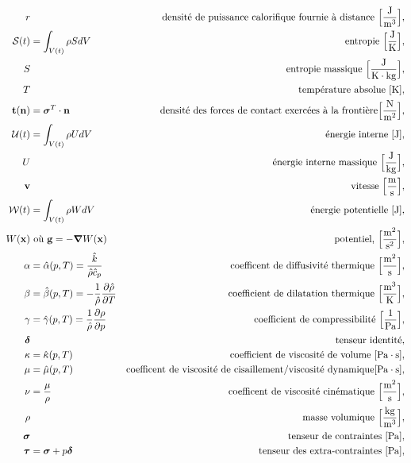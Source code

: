 \begin{align*}
      r & & \textrm{densité de puissance calorifique fournie à distance } \Big[\si{\frac{J}{m^3}}\Big],\\
      \mathcal{S}(t) &= \int_{V(t)} \rho S dV & \textrm{entropie } \Big[\si{\frac{J}{K}}\Big],\\
      S & & \textrm{entropie massique } \Big[\si{\frac{J}{K \cdot kg}}\Big],\\
      T & & \textrm{température absolue } [\si{K}],\\
      \vb{t}(\vb{n}) &= \bs{\sigma}^T \cdot \vb{n} & \textrm{densité des forces de contact exercées à la frontière} \Big[\si{\frac{N}{m^2}}\Big],\\
      \mathcal{U}(t) &= \int_{V(t)} \rho U dV & \textrm{énergie interne } [\si{J}],\\
      U & & \textrm{énergie interne massique } \Big[\si{\frac{J}{kg}}\Big],\\
      \vb{v} & & \textrm{vitesse } \Big[\si{\frac{m}{s}}\Big],\\
      \mathcal{W}(t) &= \int_{V(t)} \rho W dV & \textrm{énergie potentielle } [\si{J}],\\
      W(\vb{x}) & \textrm{ où } \vb{g} = -\grad W(\vb{x}) & \textrm{potentiel, }\Big[\si{\frac{m^2}{s^2}}\Big],\\
      \alpha &= \hat{\alpha}(p,T) = \frac{\hat{k}}{\hat{\rho}\hat{c}_p} & \textrm{coefficent de diffusivité thermique } \Big[\si{\frac{m^2}{s}}\Big], \\
      \beta &= \hat{\beta}(p,T) = -\recip{\hat{\rho}} \pdv{\hat{\rho}}{T} & \textrm{coefficient de dilatation thermique } \Big[\si{\frac{m^3}{K}}\Big],\\
      \gamma &= \hat{\gamma}(p,T) = \recip{\hat{\rho}} \pdv{\rho}{p} & \textrm{coefficient de compressibilité } \Big[\si{\recip{Pa}}\Big],\\
      \bs{\delta} & & \textrm{tenseur identité},\\
      \kappa &= \hat{\kappa}(p, T) & \textrm{coefficient de viscosité de volume } [\si{Pa \cdot s}],\\
      \mu &= \hat{\mu}(p,T) & \textrm{coefficent de viscosité de cisaillement/viscosité dynamique} [\si{Pa \cdot s}],\\
      \nu &= \frac{\mu}{\rho} & \textrm{coefficent de viscosité cinématique } \Big[\si{\frac{m^2}{s}} \Big], \\
      \rho & & \textrm{masse volumique } \Big[\si{\frac{kg}{m^3}}\Big],\\
      \bs{\sigma} & & \textrm{tenseur de contraintes } [\si{Pa} ],\\
      \bs{\tau} &= \bs{\sigma} + p \bs{\delta} & \textrm{tenseur des extra-contraintes } [\si{Pa}],
    \end{align*}
  \endgroup
